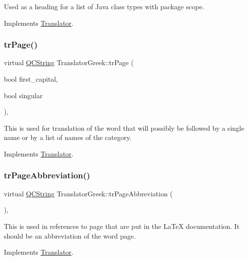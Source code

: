 Used as a heading for a list of Java class types with package scope. 

Implements \mbox{\hyperlink{class_translator}{Translator}}.

\mbox{\label{class_translator_greek_ab33b0e9ea6a0ae4816ac8616cb32356d}} 
\subsubsection{\texorpdfstring{trPage()}{trPage()}}
{\footnotesize\ttfamily virtual \mbox{\hyperlink{class_q_c_string}{Q\+C\+String}} Translator\+Greek\+::tr\+Page (\begin{DoxyParamCaption}\item[{bool}]{first\+\_\+capital,  }\item[{bool}]{singular }\end{DoxyParamCaption})\hspace{0.3cm}{\ttfamily [inline]}, {\ttfamily [virtual]}}

This is used for translation of the word that will possibly be followed by a single name or by a list of names of the category. 

Implements \mbox{\hyperlink{class_translator}{Translator}}.

\mbox{\label{class_translator_greek_a3b1dea6a2273f2630cf2712af37938a0}} 
\subsubsection{\texorpdfstring{trPageAbbreviation()}{trPageAbbreviation()}}
{\footnotesize\ttfamily virtual \mbox{\hyperlink{class_q_c_string}{Q\+C\+String}} Translator\+Greek\+::tr\+Page\+Abbreviation (\begin{DoxyParamCaption}{ }\end{DoxyParamCaption})\hspace{0.3cm}{\ttfamily [inline]}, {\ttfamily [virtual]}}

This is used in references to page that are put in the La\+TeX documentation. It should be an abbreviation of the word page. 

Implements \mbox{\hyperlink{class_translator}{Translator}}.

